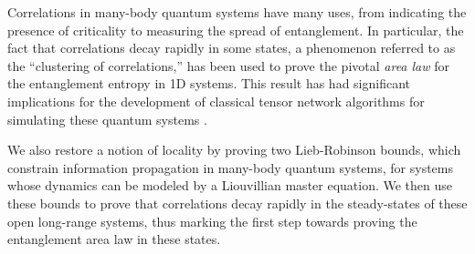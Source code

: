 
Correlations in many-body quantum systems have many uses, from indicating the presence of criticality to measuring the spread of entanglement. In particular, the fact that correlations decay rapidly in some states, a phenomenon referred to as the “clustering of correlations,” has been used to prove the pivotal \emph{area law} for the entanglement entropy in 1D systems. This result has had significant implications for the development of classical tensor network algorithms for simulating these quantum systems \cite{Hastings07}.

We also restore a notion of locality by proving two Lieb-Robinson bounds, which constrain information propagation in many-body quantum systems, for systems whose dynamics can be modeled by a Liouvillian master equation. We then use these bounds to prove that correlations decay rapidly in the steady-states of these open long-range systems, thus marking the first step towards proving the entanglement area law in these states.
